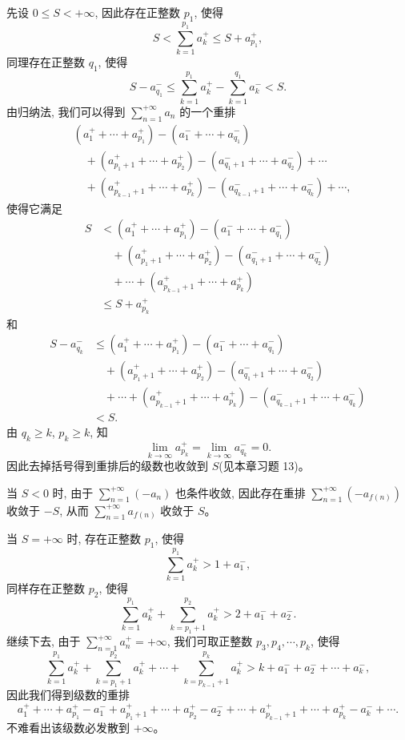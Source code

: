 \documentclass[UTF8,12pt,a4paper,fontset=fandol]{ctexart}
\begin{document}
先设 $0\leq S<+\infty$, 因此存在正整数 $p_1$, 使得
\[
  S<\sum_{k=1}^{p_1}a_k^+\leq S+a_{p_1}^+,
\]
同理存在正整数 $q_1$, 使得
\[
  S-a_{q_1}^-\leq\sum_{k=1}^{p_1}a_k^+-\sum_{k=1}^{q_1}a_k^-<S.
\]
由归纳法, 我们可以得到 $\sum\limits_{n=1}^{+\infty}a_n$ 的一个重排
\[
\begin{aligned}
  &(a_1^++\cdots+a_{p_1}^+)-(a_1^-+\cdots+a_{q_1}^-)\\
  &\quad +(a_{p_1+1}^++\cdots+a_{p_2}^+)-(a_{q_1+1}^-+\cdots+a_{q_2}^-)+\cdots\\
  &\quad +(a_{p_{k-1}+1}^++\cdots+a_{p_k}^+)-(a_{q_{k-1}+1}^-+\cdots+a_{q_k}^-)+\cdots,
\end{aligned}
\]
使得它满足
\[
\begin{aligned}
  S
  &< (a_1^++\cdots+a_{p_1}^+)-(a_1^-+\cdots+a_{q_1}^-)\\
  &\quad +(a_{p_1+1}^++\cdots+a_{p_2}^+)-(a_{q_1+1}^-+\cdots+a_{q_2}^-)\\
  &\quad +\cdots+(a_{p_{k-1}+1}^++\cdots+a_{p_k}^+)\\
  &\leq S+a_{p_k}^+
\end{aligned}
\]
和
\[
\begin{aligned}
  S-a_{q_k}^-
  &\leq (a_1^++\cdots+a_{p_1}^+)-(a_1^-+\cdots+a_{q_1}^-)\\
  &\quad +(a_{p_1+1}^++\cdots+a_{p_2}^+)-(a_{q_1+1}^-+\cdots+a_{q_2}^-)\\
  &\quad +\cdots+(a_{p_{k-1}+1}^++\cdots+a_{p_k}^+)-(a_{q_{k-1}+1}^-+\cdots+a_{q_k}^-)\\
  &<S.
\end{aligned}
\]
由 $q_k\geq k$, $p_k\geq k$, 知
\[
  \lim_{k\to\infty}a_{p_k}^+=\lim_{k\to\infty}a_{q_k}^-=0.
\]
因此去掉括号得到重排后的级数也收敛到 $S$(见本章习题 13)。

当 $S<0$ 时, 由于 $\sum\limits_{n=1}^{+\infty}(-a_n)$ 也条件收敛, 因此存在重排 $\sum\limits_{n=1}^{+\infty}(-a_{f(n)})$ 收敛于 $-S$, 从而 $\sum\limits_{n=1}^{+\infty}a_{f(n)}$ 收敛于 $S$。

当 $S=+\infty$ 时, 存在正整数 $p_1$, 使得
\[
  \sum_{k=1}^{p_1}a_k^+>1+a_1^-,
\]
同样存在正整数 $p_2$, 使得
\[
  \sum_{k=1}^{p_1}a_k^++\sum_{k=p_1+1}^{p_2}a_k^+>2+a_1^-+a_2^-.
\]
继续下去, 由于 $\sum\limits_{n=1}^{+\infty}a_n^+=+\infty$, 我们可取正整数 $p_3,p_4,\cdots,p_k$, 使得
\[
  \sum_{k=1}^{p_1}a_k^++\sum_{k=p_1+1}^{p_2}a_k^++\cdots+\sum_{k=p_{k-1}+1}^{p_k}a_k^+
  > k+a_1^-+a_2^-+\cdots+a_k^-,
\]
因此我们得到级数的重排
\[
  a_1^++\cdots+a_{p_1}^+-a_1^-+a_{p_1+1}^++\cdots+a_{p_2}^+-a_2^-+\cdots
  +a_{p_{k-1}+1}^++\cdots+a_{p_k}^+-a_k^-+\cdots.
\]
不难看出该级数必发散到 $+\infty$。
\end{document}
